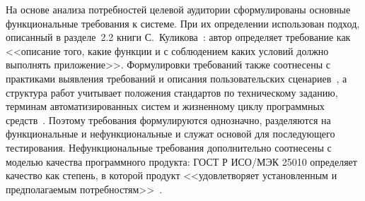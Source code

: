 На основе анализа потребностей целевой аудитории сформулированы основные функциональные требования к системе. При их определении использован подход, описанный в разделе~2.2 книги С.~Куликова~\cite{kulikov2020testing}: автор определяет требование как <<описание того, какие функции и с соблюдением каких условий должно выполнять приложение>>. Формулировки требований также соотнесены с практиками выявления требований и описания пользовательских сценариев~\cite{wigers2014,cockburn2002}, а структура работ учитывает положения стандартов по техническому заданию, терминам автоматизированных систем и жизненному циклу программных средств~\cite{gost34602,gost34003,gost12207}. Поэтому требования формулируются однозначно, разделяются на функциональные и нефункциональные и служат основой для последующего тестирования. Нефункциональные требования дополнительно соотнесены с моделью качества программного продукта: ГОСТ Р ИСО/МЭК 25010 определяет качество как степень, в которой продукт <<удовлетворяет установленным и предполагаемым потребностям>>~\cite{gost25010}.
